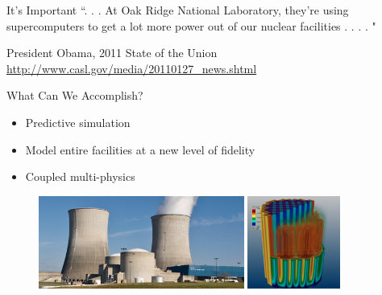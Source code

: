 \documentclass[xcolor=x11names,compress, handout]{beamer}
\renewcommand{\(}{\begin{columns}}
\renewcommand{\)}{\end{columns}}
\newcommand{\<}[1]{\begin{column}{#1}}
\renewcommand{\>}{\end{column}}
\begin{document}
\begin{frame}{It's Important}
``. . . At Oak Ridge National Laboratory, they're using supercomputers to get a lot more power out of our nuclear facilities . . . . "

\vspace*{0.5 in}
President Obama, 2011 State of the Union\\
\href{http://www.casl.gov/media/20110127\_news.shtml}{http://www.casl.gov/media/20110127\_news.shtml}
\end{frame}

\begin{frame}{What Can We Accomplish?}
\begin{itemize}
\item Predictive simulation 
\item Model entire facilities at a new level of fidelity
\item Coupled multi-physics
\end{itemize}
\begin{figure}
\includegraphics[height=1.2in,clip]{WattsBar}
\hfill
\includegraphics[height=1.2in,clip]{DenovoCore}
\end{figure}
\end{frame}
\end{document}
